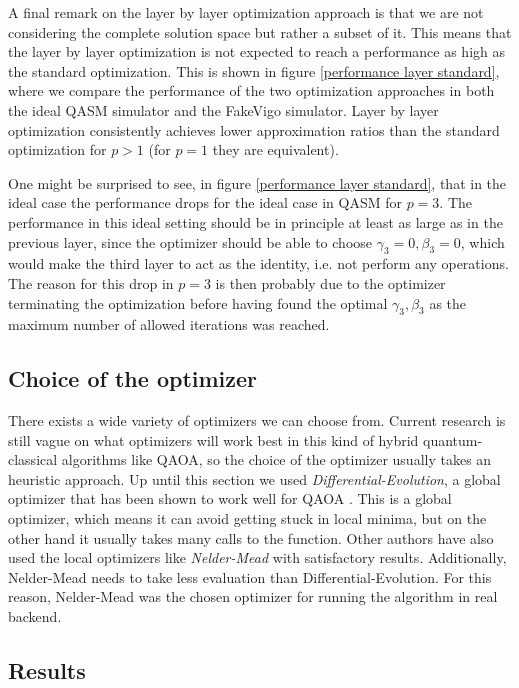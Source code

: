 A final remark on the layer by layer optimization approach is that we are not considering the complete solution space but rather a subset of it. This means that the layer by layer optimization is not expected to reach a performance as high as the standard optimization. This is shown in figure \ref{performance layer standard}, where we compare the performance of the two optimization approaches in both the ideal QASM simulator and the FakeVigo simulator. Layer by layer optimization consistently achieves lower approximation ratios than the standard optimization for $p>1$ (for $p=1$ they are equivalent). 

One might be surprised to see, in figure \ref{performance layer standard}, that in the ideal case the performance drops for the ideal case in QASM for $p=3$. The performance in this ideal setting should be in principle at least as large as in the previous layer, since the optimizer should be able to choose $\gamma_3=0, \beta_3=0$, which would make the third layer to act as the identity, i.e. not perform any operations. The reason for this drop in $p=3$ is then probably due to the optimizer terminating the optimization before having found the optimal $\gamma_3, \beta_3$ as the maximum number of allowed iterations was reached.


\subsection{Choice of the optimizer}

There exists a wide variety of optimizers we can choose from. Current research is still vague on what optimizers will work best in this kind of hybrid quantum-classical algorithms like QAOA, so the choice of the optimizer usually takes an heuristic approach. Up until this section we used \textit{Differential-Evolution}, a global optimizer that has been shown to work well for QAOA \cite{alam2019analysis}. This is a global optimizer, which means it can avoid getting stuck in local minima, but on the other hand it usually takes many calls to the function. Other authors \cite{Lacroix_2020} have also used the local optimizers like \textit{Nelder-Mead} with satisfactory results. Additionally, Nelder-Mead needs to take less evaluation than Differential-Evolution. For this reason, Nelder-Mead was the chosen optimizer for running the algorithm in real backend.


\subsection{Results}


